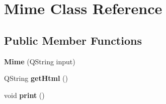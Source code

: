 \hypertarget{classMime}{
\section{Mime Class Reference}
\label{classMime}
}
\subsection*{Public Member Functions}
\begin{DoxyCompactItemize}
\item 
\hypertarget{classMime_ab46debb17499b419e289776867ec87af}{
{\bfseries Mime} (QString input)}
\label{classMime_ab46debb17499b419e289776867ec87af}

\item 
\hypertarget{classMime_add9a610f058b22d991db70ad231e182d}{
QString {\bfseries getHtml} ()}
\label{classMime_add9a610f058b22d991db70ad231e182d}

\item 
\hypertarget{classMime_ae27161f748bf681a924b9ff536d95942}{
void {\bfseries print} ()}
\label{classMime_ae27161f748bf681a924b9ff536d95942}

\end{DoxyCompactItemize}
